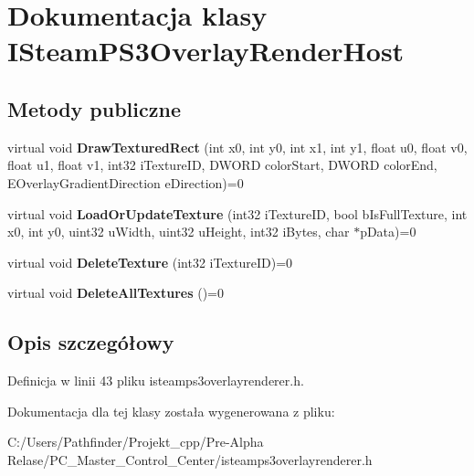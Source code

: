 \hypertarget{class_i_steam_p_s3_overlay_render_host}{}\section{Dokumentacja klasy I\+Steam\+P\+S3\+Overlay\+Render\+Host}
\label{class_i_steam_p_s3_overlay_render_host}
\subsection*{Metody publiczne}
\begin{DoxyCompactItemize}
\item 
\mbox{\label{class_i_steam_p_s3_overlay_render_host_aceea6859e6dc17d4777d46f402967004}} 
virtual void {\bfseries Draw\+Textured\+Rect} (int x0, int y0, int x1, int y1, float u0, float v0, float u1, float v1, int32 i\+Texture\+ID, D\+W\+O\+RD color\+Start, D\+W\+O\+RD color\+End, E\+Overlay\+Gradient\+Direction e\+Direction)=0
\item 
\mbox{\label{class_i_steam_p_s3_overlay_render_host_af53191a1a3cc8181569de10b8661c8eb}} 
virtual void {\bfseries Load\+Or\+Update\+Texture} (int32 i\+Texture\+ID, bool b\+Is\+Full\+Texture, int x0, int y0, uint32 u\+Width, uint32 u\+Height, int32 i\+Bytes, char $\ast$p\+Data)=0
\item 
\mbox{\label{class_i_steam_p_s3_overlay_render_host_af2888b63f4914f8fcd21c83a00a14b49}} 
virtual void {\bfseries Delete\+Texture} (int32 i\+Texture\+ID)=0
\item 
\mbox{\label{class_i_steam_p_s3_overlay_render_host_a857354eca757374a2dd5bca550d432ab}} 
virtual void {\bfseries Delete\+All\+Textures} ()=0
\end{DoxyCompactItemize}


\subsection{Opis szczegółowy}


Definicja w linii 43 pliku isteamps3overlayrenderer.\+h.



Dokumentacja dla tej klasy została wygenerowana z pliku\+:\begin{DoxyCompactItemize}
\item 
C\+:/\+Users/\+Pathfinder/\+Projekt\+\_\+cpp/\+Pre-\/\+Alpha Relase/\+P\+C\+\_\+\+Master\+\_\+\+Control\+\_\+\+Center/isteamps3overlayrenderer.\+h\end{DoxyCompactItemize}
